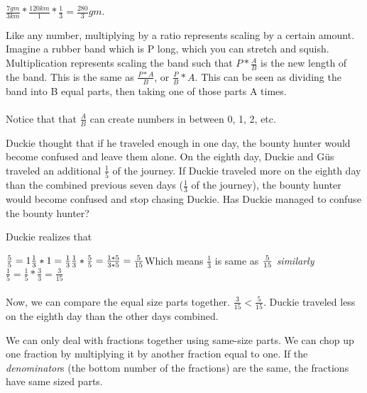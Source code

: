 {$\frac{7 gm}{3 km}\ast\frac{120 km}{1}\ast\frac{1}{3}=\frac{280}{3} gm$.}
{Like any number, multiplying by a ratio represents scaling by a certain amount. Imagine a rubber band which is P long, which you can stretch and squish. Multiplication represents scaling the band such that $P\ast\frac{A}{B}$ is the new length of the band. This is the same as $\frac{P\ast A}{B}$, or $\frac{P}{B}\ast A$. This can be seen as dividing the band into B equal parts, then taking one of those parts A times. \paragraph{} Notice that that $\frac{A}{B}$ can create numbers in between 0, 1, 2, etc.}
{}
{Duckie thought that if he traveled enough in one day, the bounty hunter would become confused and leave them alone. On the eighth day, Duckie and Güs traveled an additional $\frac{1}{5}$ of the journey. If Duckie traveled more on the eighth day than the combined previous seven days ($\frac{1}{3}$ of the journey), the bounty hunter would become confused and stop chasing Duckie. Has Duckie managed to confuse the bounty hunter?}{Duckie realizes that \begin{center}
    $\frac{5}{5}=1 \linebreak
    \frac{1}{3}\ast 1 = \frac{1}{3} \linebreak
    \frac{1}{3}\ast\frac{5}{5} = \frac{1\ast 5}{3\ast 5} = \frac{5}{15}\linebreak  $Which means $\frac{1}{3}$  is same as  $\frac{5}{15} \linebreak\linebreak$
    \textit{similarly}
   $ \frac{1}{5} = \frac{1}{5}\ast\frac{3}{3} = \frac{3}{15}$
\end{center}
\paragraph{} Now, we can compare the equal size parts together. $\frac{3}{15} < \frac{5}{15}$. Duckie traveled less on the eighth day than the other days combined.}{We can only deal with fractions together using same-size parts. We can chop up one fraction by multiplying it by another fraction equal to one. If the \textit{denominator}s (the bottom number of the fractions) are the same, the fractions have same sized parts.}
{}
